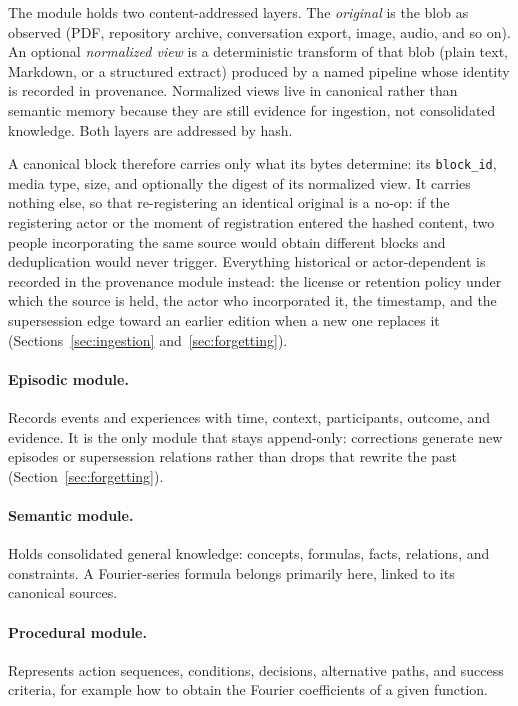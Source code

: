 \documentclass[11pt,a4paper]{article}
\begin{document}
The module holds two content-addressed layers. The \emph{original} is the blob
as observed (PDF, repository archive, conversation export, image, audio, and so
on). An optional \emph{normalized view} is a deterministic transform of that blob
(plain text, Markdown, or a structured extract) produced by a named pipeline
whose identity is recorded in provenance. Normalized views live in canonical
rather than semantic memory because they are still evidence for ingestion, not
consolidated knowledge. Both layers are addressed by hash.

A canonical block therefore carries only what its bytes determine: its
\texttt{block\_id}, media type, size, and optionally the digest of its
normalized view. It carries nothing else, so that re-registering an identical original is a
no-op: if the registering actor or the moment of registration entered the
hashed content, two people incorporating the same source would obtain
different blocks and deduplication would never trigger. Everything historical
or actor-dependent is recorded in the provenance module instead: the license
or retention policy under which the source is held, the actor who incorporated
it, the timestamp, and the supersession edge toward an earlier edition when a
new one replaces it (Sections~\ref{sec:ingestion} and~\ref{sec:forgetting}).

\paragraph{Episodic module.}
Records events and experiences with time, context, participants, outcome, and
evidence. It is the only module that stays append-only: corrections generate
new episodes or supersession relations rather than drops that rewrite the past
(Section~\ref{sec:forgetting}).

\paragraph{Semantic module.}
Holds consolidated general knowledge: concepts, formulas, facts, relations, and
constraints. A Fourier-series formula belongs primarily here, linked to its
canonical sources.

\paragraph{Procedural module.}
Represents action sequences, conditions, decisions, alternative paths, and
success criteria, for example how to obtain the Fourier coefficients of a
given function.
\end{document}
